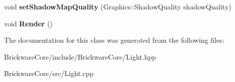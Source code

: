 \begin{DoxyCompactItemize}
\item 
\hypertarget{classBrickware_1_1Core_1_1Light_aa7b96ba40243f67cb8290c181c8f1f54}{}void {\bfseries set\+Shadow\+Map\+Quality} (Graphics\+::\+Shadow\+Quality shadow\+Quality)\label{classBrickware_1_1Core_1_1Light_aa7b96ba40243f67cb8290c181c8f1f54}

\item 
\hypertarget{classBrickware_1_1Core_1_1Light_a44550ae09e953731d0bf262a2c443e5d}{}void {\bfseries Render} ()\label{classBrickware_1_1Core_1_1Light_a44550ae09e953731d0bf262a2c443e5d}

\end{DoxyCompactItemize}


The documentation for this class was generated from the following files\+:\begin{DoxyCompactItemize}
\item 
Brickware\+Core/include/\+Brickware\+Core/Light.\+hpp\item 
Brickware\+Core/src/Light.\+cpp\end{DoxyCompactItemize}
